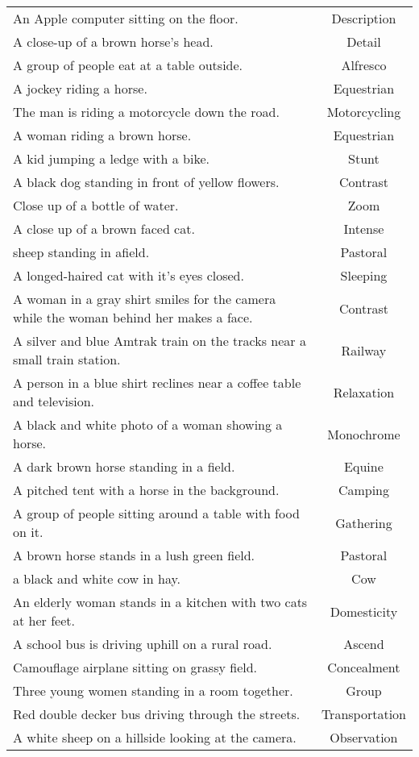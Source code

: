\begin{longtable}{p{12cm}c}
An Apple computer sitting on the floor. & Description\\
A close-up of a brown horse's head. & Detail\\
A group of people eat at a table outside. & Alfresco\\
A jockey riding a horse. & Equestrian\\
The man is riding a motorcycle down the road. & Motorcycling\\
A woman riding a brown horse. & Equestrian\\
A kid jumping a ledge with a bike. & Stunt\\
A black dog standing in front of yellow flowers. & Contrast\\
Close up of a bottle of water. & Zoom\\
A close up of a brown faced cat. & Intense\\
sheep standing in afield. & Pastoral\\
A longed-haired cat with it's eyes closed. & Sleeping\\
A woman in a gray shirt smiles for the camera while the woman behind her makes a face. & Contrast\\
A silver and blue Amtrak train on the tracks near a small train station. & Railway\\
A person in a blue shirt reclines near a coffee table and television. & Relaxation\\
A black and white photo of a woman showing a horse. & Monochrome\\
A dark brown horse standing in a field. & Equine\\
A pitched tent with a horse in the background. & Camping\\
A group of people sitting around a table with food on it. & Gathering\\
A brown horse stands in a lush green field. & Pastoral\\
a black and white cow in hay. & Cow\\
An elderly woman stands in a kitchen with two cats at her feet. & Domesticity\\
A school bus is driving uphill on a rural road. & Ascend\\
Camouflage airplane sitting on grassy field. & Concealment\\
Three young women standing in a room together. & Group\\
Red double decker bus driving through the streets. & Transportation\\
A white sheep on a hillside looking at the camera. & Observation\\

\end{longtable}

